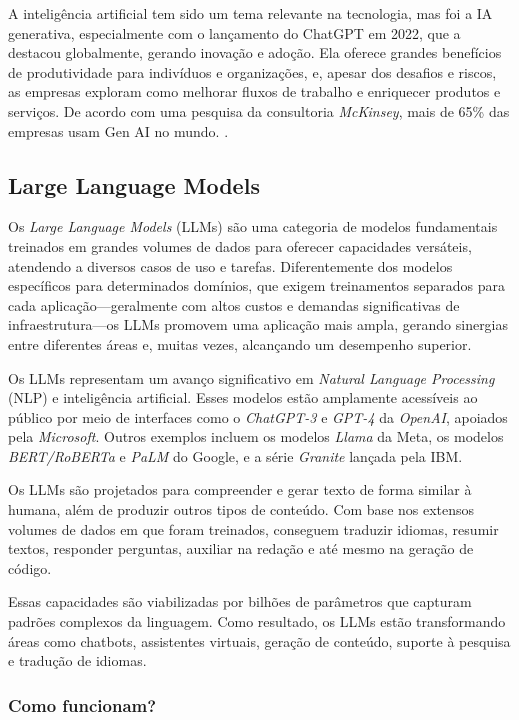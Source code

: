 \documentclass[a4paper, 12pt]{article}
\newcommand{\citeb}[1]{\bibleftbracket\cite{#1}\bibrightbracket}
\begin{document}
    A inteligência artificial tem sido um tema relevante na tecnologia, mas foi a IA generativa, especialmente com o lançamento do ChatGPT em 2022, que a destacou globalmente, gerando inovação e adoção. Ela oferece grandes benefícios de produtividade para indivíduos e organizações, e, apesar dos desafios e riscos, as empresas exploram como melhorar fluxos de trabalho e enriquecer produtos e serviços. De acordo com uma pesquisa da consultoria \textit{McKinsey}, mais de 65\% das empresas usam Gen AI no mundo. \citeb{mckinsey_genai}.

    \subsection{Large Language Models}

    Os \textit{Large Language Models} (LLMs) são uma categoria de modelos fundamentais treinados em grandes volumes de dados para oferecer capacidades versáteis, atendendo a diversos casos de uso e tarefas. Diferentemente dos modelos específicos para determinados domínios, que exigem treinamentos separados para cada aplicação—geralmente com altos custos e demandas significativas de infraestrutura—os LLMs promovem uma aplicação mais ampla, gerando sinergias entre diferentes áreas e, muitas vezes, alcançando um desempenho superior. \citeb{llm_ibm}

    Os LLMs representam um avanço significativo em \textit{Natural Language Processing} (NLP) e inteligência artificial. Esses modelos estão amplamente acessíveis ao público por meio de interfaces como o \textit{ChatGPT-3} e \textit{GPT-4} da \textit{OpenAI}, apoiados pela \textit{Microsoft}. Outros exemplos incluem os modelos \textit{Llama} da Meta, os modelos \textit{BERT/RoBERTa} e \textit{PaLM} do Google, e a série \textit{Granite} lançada pela IBM.

    Os LLMs são projetados para compreender e gerar texto de forma similar à humana, além de produzir outros tipos de conteúdo. Com base nos extensos volumes de dados em que foram treinados, conseguem traduzir idiomas, resumir textos, responder perguntas, auxiliar na redação e até mesmo na geração de código.

    Essas capacidades são viabilizadas por bilhões de parâmetros que capturam padrões complexos da linguagem. Como resultado, os LLMs estão transformando áreas como chatbots, assistentes virtuais, geração de conteúdo, suporte à pesquisa e tradução de idiomas.

    \subsubsection{Como funcionam?}
\end{document}
